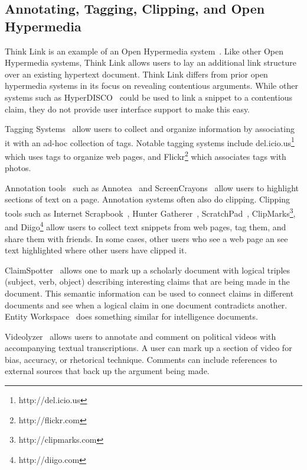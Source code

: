 \documentclass{chi2009}
\newcommand{\todo}[1]{}
\begin{document}
\subsection{Annotating, Tagging, Clipping, and Open Hypermedia}

Think Link is an example of an Open Hypermedia system~\cite{Bouvin2000}. Like other Open Hypermedia systems, Think Link allows users to lay an additional link structure over an existing hypertext document. Think Link differs from prior open hypermedia systems in its focus on revealing contentious arguments. While other systems such as HyperDISCO~\cite{Wiil1996} could be used to link a snippet to a contentious claim, they do not provide user interface support to make this easy.

\todo{Say how different from other Open Hypermedia link annotation systems}

Tagging Systems~\cite{Marlow2006,Golder2006} allow users to collect and organize information by associating it with an ad-hoc collection of tags. Notable tagging systems include del.icio.us\footnote{http://del.icio.us} which uses tags to organize web pages, and Flickr\footnote{http://flickr.com} which associates tags with photos. 

Annotation tools~\cite{Marshall1998} such as Annotea~\cite{Koivunen2001} and ScreenCrayons~\cite{Olsen2004} allow users to highlight sections of text on a page. Annotation systems often also do clipping. Clipping tools such as Internet Scrapbook~\cite{Sugiura1998}, Hunter Gatherer~\cite{Schraefel2002}, ScratchPad~\cite{Gotz2007}, ClipMarks\footnote{http://clipmarks.com}, and Diigo\footnote{http://diigo.com} allow users to collect text snippets from web pages, tag them, and share them with friends. In some cases, other users who see a web page an see text highlighted where other users have clipped it.

ClaimSpotter~\cite{Sereno2005,Sereno2004} allows one to mark up a scholarly document with logical triples (subject, verb, object) describing interesting claims that are being made in the document. This semantic information can be used to connect claims in different documents and see when a logical claim in one document contradicts another. Entity Workspace~\cite{Bier2006} does something similar for intelligence documents.  

Videolyzer~\cite{Diakopoulos2008} allows users to annotate and comment on political videos with accompanying textual transcriptions. A user can mark up a section of video for bias, accuracy, or rhetorical technique. Comments can include references to external sources that back up the argument being made. 
\end{document}
